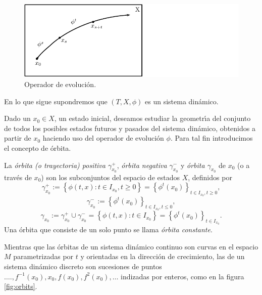 \begin{figure}[!ht] \centering
    \includegraphics[scale=1.3]{figures/evolution-operator.pdf}
    \caption{Operador de evolución.}
	\label{fig:evolutionoperator}
\end{figure}

En lo que sigue supondremos que $( T, X, \phi )$ es un sistema
dinámico.

Dado un $x_0 \in X$, un estado inicial, deseamos estudiar la geometr\'{\i}a del
conjunto de todos los posibles estados futuros y pasados del sistema
din\'amico, obtenidos a partir de $x_0$ haciendo uso del operador de
evoluci\'on $\phi$.
Para tal fin introducimos el concepto de órbita.

\begin{definition}
  \label{def:orbit}La {\emph{\'orbita (o trayectoria) positiva
  $\gamma^+_{x_0}$}}, {\emph{\'orbita negativa $\gamma^-_{x_0}$}} y
  {\emph{\'orbita $\gamma_{x_0}$}} de $x_0$ (o a trav\'es de $x_0$) son
  los subconjuntos del espacio de estados $X$, definidos por
  \[ \gamma^+_{x_0} := \left\{ \phi \left( t, x \right) : t \in I_{x_0},
     t \geq 0 \right\} = \left\{ \phi^t \left( x_0 \right) \right\}_{t
     \in I_{x_0}, t \geq 0}, \]
  \[ \gamma^-_{x_0} := \left\{ \phi^t \left( x_0 \right) \right\}_{t \in
     I_{x_0}, t \leq 0}, \]
  \[ \gamma_{x_0} := \gamma_{x_0}^+ \cup \gamma_{x_0}^- = \left\{ \phi
     \left( t, x \right) : t \in I_{x_0} \right\} = \left\{ \phi^t \left( x_0
     \right) \right\}_{t \in I_{x_0}} . \]
  Una \'orbita que consiste de un solo punto se llama {\emph{\'orbita
  constante}}.
\end{definition}

Mientras que las \'orbitas de un sistema din\'amico continuo son curvas en el
espacio $M$ parametrizadas por $t$ y orientadas en la direcci\'on de
crecimiento, las de un sistema din\'amico discreto son sucesiones de puntos
$\ldots ., f^{- 1} \left( x_0 \right), x_0, f \left( x_0 \right), f^2 \left(
x_0 \right), \ldots$ indizadas por enteros, como en la figura \ref{fig:orbits}.

